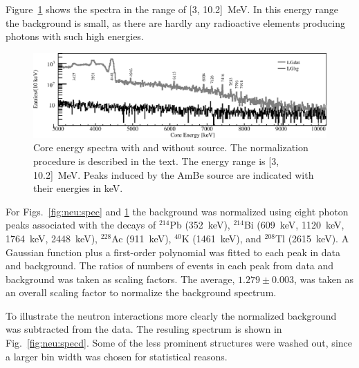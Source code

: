 Figure~\ref{fig:neu:specl} shows the spectra in the range of [3,
10.2]~MeV. In this energy range the background is small, as there are
hardly any radioactive elements producing photons with such high
energies.

\begin{figure}[tbhp]
  \centering
  \includegraphics[width=\textwidth,clip]{spectra_3_11MeV}
  \caption{Core energy spectra with and without source. The
    normalization procedure is described in the text. The energy range
    is [3, 10.2]~MeV. Peaks induced by the AmBe source are indicated
    with their energies in keV.}
  \label{fig:neu:specl}
\end{figure}

For Figs.~\ref{fig:neu:spec} and \ref{fig:neu:specl} the background
was normalized using eight photon peaks associated with the decays of
$^{214}$Pb (352~keV), $^{214}$Bi (609~keV, 1120~keV, 1764~keV,
2448~keV), $^{228}$Ac (911~keV), $^{40}$K (1461~keV), and $^{208}$Tl
(2615~keV). A Gaussian function plus a first-order polynomial was
fitted to each peak in data and background. The ratios of numbers of
events in each peak from data and background was taken as scaling
factors. The average, $1.279 \pm 0.003$, was taken as an overall
scaling factor to normalize the background spectrum.

To illustrate the neutron interactions more clearly the normalized
background was subtracted from the data. The resuling spectrum is
shown in Fig.~\ref{fig:neu:specd}. Some of the less prominent
structures were washed out, since a larger bin width was chosen for
statistical reasons.

